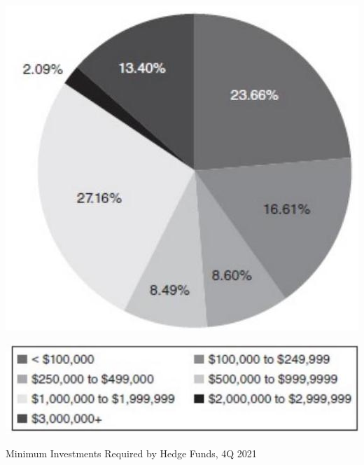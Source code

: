 \documentclass[11pt]{article}
\begin{document}
\begin{center}
\includegraphics[max width=\textwidth]{2024_04_09_2a059f6740e65d00331bg-2}
\end{center}

\begin{center}
\includegraphics[max width=\textwidth]{2024_04_09_2a059f6740e65d00331bg-2(1)}
\end{center}

Minimum Investments Required by Hedge Funds, 4Q 2021
\end{document}
